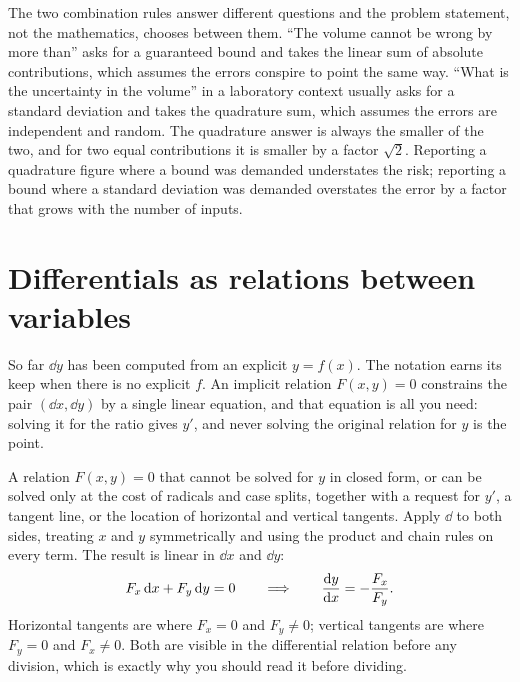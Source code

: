 \begin{keynote}
The two combination rules answer different questions and the problem statement, not the mathematics, chooses between them. ``The volume cannot be wrong by more than'' asks for a guaranteed bound and takes the linear sum of absolute contributions, which assumes the errors conspire to point the same way. ``What is the uncertainty in the volume'' in a laboratory context usually asks for a standard deviation and takes the quadrature sum, which assumes the errors are independent and random. The quadrature answer is always the smaller of the two, and for two equal contributions it is smaller by a factor $\sqrt2$. Reporting a quadrature figure where a bound was demanded understates the risk; reporting a bound where a standard deviation was demanded overstates the error by a factor that grows with the number of inputs.
\end{keynote}

\section{Differentials as relations between variables}

So far $\dd y$ has been computed from an explicit $y=f(x)$. The notation earns its keep when there is no explicit $f$. An implicit relation $F(x,y)=0$ constrains the pair $(\dd x,\dd y)$ by a single linear equation, and that equation is all you need: solving it for the ratio gives $y'$, and never solving the original relation for $y$ is the point.

\cue A relation $F(x,y)=0$ that cannot be solved for $y$ in closed form, or can be solved only at the cost of radicals and case splits, together with a request for $y'$, a tangent line, or the location of horizontal and vertical tangents.
\method Apply $\dd$ to both sides, treating $x$ and $y$ symmetrically and using the product and chain rules on every term. The result is linear in $\dd x$ and $\dd y$:
\[F_x\,\mathrm{d} x+F_y\,\mathrm{d} y=0\qquad\Longrightarrow\qquad \frac{\mathrm{d}y}{\mathrm{d}x}=-\frac{F_x}{F_y}.\]
Horizontal tangents are where $F_x=0$ and $F_y\neq0$; vertical tangents are where $F_y=0$ and $F_x\neq0$. Both are visible in the differential relation before any division, which is exactly why you should read it before dividing.

